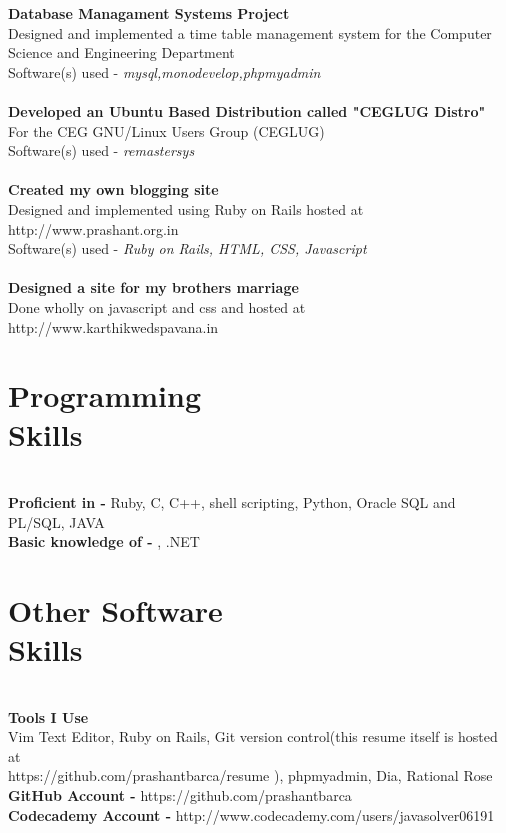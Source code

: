 \documentclass[margin,line]{resume}
\begin{document}
\begin{resume}
    \textbf{Database Managament Systems Project} \\Designed and implemented a time table management system for the Computer Science and Engineering Department \vspace{2mm}\\\vspace{1mm}%
    Software(s) used -  \textsl{mysql,monodevelop,phpmyadmin}\\
    \\\textbf{Developed an Ubuntu Based Distribution called "CEGLUG Distro"} \\For the CEG GNU/Linux Users Group (CEGLUG) \vspace{2mm}\\\vspace{1mm}%
    Software(s) used -  \textsl{remastersys}\\
    \\\textbf{Created my own blogging site} \\Designed and implemented using Ruby on Rails hosted at http://www.prashant.org.in \vspace{2mm}\\\vspace{1mm}%
    Software(s) used -  \textsl{Ruby on Rails, HTML, CSS, Javascript}\\
    \\\textbf{Designed a site for my brothers marriage} \\Done wholly on javascript and css and hosted at http://www.karthikwedspavana.in  \vspace{2mm}\\\vspace{1mm}%

    \section{\mysidestyle Programming\\Skills}\\ 
    \textbf{Proficient in -}  Ruby, C, C++, shell scripting, Python, Oracle SQL and PL/SQL, JAVA
\\\textbf{Basic knowledge of -}  \LaTeXe, .NET 

    \section{\mysidestyle Other Software\\Skills} \\
    \textbf{Tools I Use}  \\Vim Text Editor, Ruby on Rails, Git version control(this resume itself is hosted at \\https://github.com/prashantbarca/resume ), phpmyadmin, Dia, Rational Rose
    \\\textbf{GitHub Account -}  https://github.com/prashantbarca
    \\\textbf{Codecademy Account -}  http://www.codecademy.com/users/javasolver06191

\end{resume}
\end{document}

